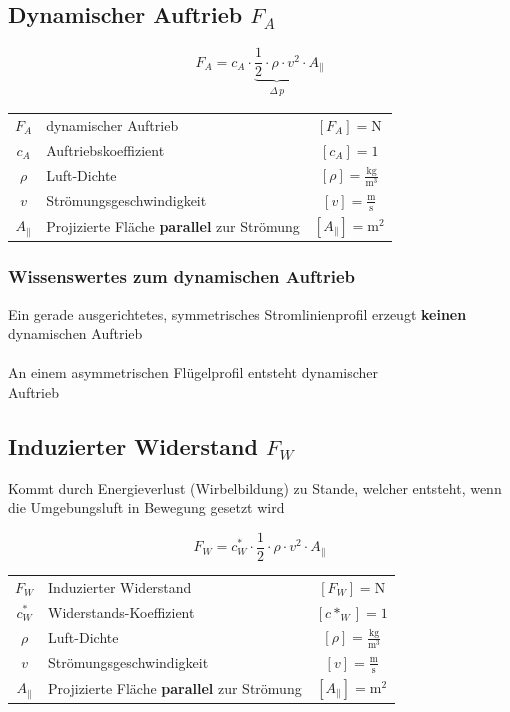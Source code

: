 


\subsection{Dynamischer Auftrieb $F_A$}

$$ \boxed{ F_A = c_A \cdot  \underbrace{\frac{1}{2} \cdot \rho \cdot v^2 }_{\substack{\Delta \, p}} \cdot A_{\|}	} $$


\begin{tabular}{c l c}
		$F_A$ & dynamischer Auftrieb & $[F_A] = \mathrm{N}$ \\
		$c_A$ & Auftriebskoeffizient & $[c_A] = 1$ \\
		\rule{0pt}{8pt}$\rho$ & Luft-Dichte & $[\rho] = \mathrm{\frac{kg}{m^3}}$ \\
		\rule{0pt}{8pt}$v$ & Strömungsgeschwindigkeit & $[v] = \mathrm{\frac{m}{s}}$ \\
		$A_{\|}$ & Projizierte Fläche \textbf{parallel} zur Strömung & $[A_{\|}] = \mathrm{m^2}$ \\
\end{tabular}




\subsubsection{Wissenswertes zum dynamischen Auftrieb}
Ein gerade ausgerichtetes, symmetrisches Stromlinienprofil erzeugt \textbf{keinen} dynamischen Auftrieb \\
\\
An einem asymmetrischen Flügelprofil entsteht dynamischer\\
Auftrieb 


\subsection{Induzierter Widerstand $F_W$}
Kommt durch Energieverlust (Wirbelbildung) zu Stande, welcher entsteht, wenn die Umgebungsluft in Bewegung gesetzt wird

$$ \boxed{ F_W = c^*_W \cdot \frac{1}{2} \cdot \rho \cdot v^2 \cdot A_{\|} } $$


\begin{tabular}{c l c}
		$F_W$ & Induzierter Widerstand & $[F_W] = \mathrm{N}$ \\
		$c^*_W$ & Widerstands-Koeffizient & $[c*_W] = 1$ \\
		\rule{0pt}{8pt}$\rho$ & Luft-Dichte & $[\rho] = \mathrm{\frac{kg}{m^3}}$ \\
		\rule{0pt}{8pt}$v$ & Strömungsgeschwindigkeit & $[v] = \mathrm{\frac{m}{s}}$ \\
		$A_{\|}$ & Projizierte Fläche \textbf{parallel} zur Strömung & $[A_{\|}] = \mathrm{m^2}$ \\
\end{tabular}

